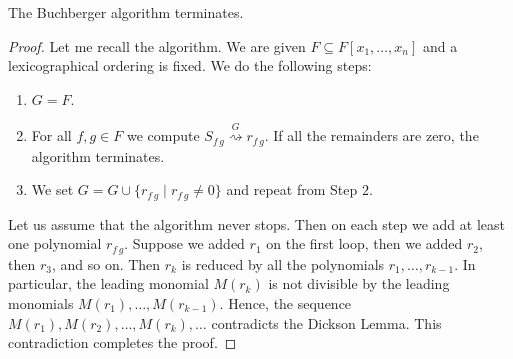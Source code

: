 \begin{claim}
The Buchberger algorithm terminates.
\end{claim}
\begin{proof}
Let me recall the algorithm.
We are given $F\subseteq F[x_1,\ldots, x_n]$ and a lexicographical ordering is fixed.
We do the following steps:
\begin{enumerate}
\item $G = F$.

\item For all $f, g\in F$ we compute $S_{f\,g}\stackrel{G}{\rightsquigarrow} r_{f\, g}$.
If all the remainders are zero, the algorithm terminates.

\item We set $G = G \cup \{r_{f\,g}\mid r_{f\,g}\neq 0\}$ and repeat from Step $2$.
\end{enumerate}
Let us assume that the algorithm never stops.
Then on each step we add at least one polynomial $r_{f\, g}$.
Suppose we added $r_1$ on the first loop, then we added $r_2$, then $r_3$, and so on.
Then $r_k$ is reduced by all the polynomials $r_1,\ldots, r_{k-1}$.
In particular, the leading monomial $M(r_k)$ is not divisible by the leading monomials $M(r_1), \ldots, M(r_{k-1})$.
Hence, the sequence $M(r_1), M(r_2),\ldots, M(r_k),\ldots$ contradicts the Dickson Lemma.
This contradiction completes the proof.
\end{proof}
